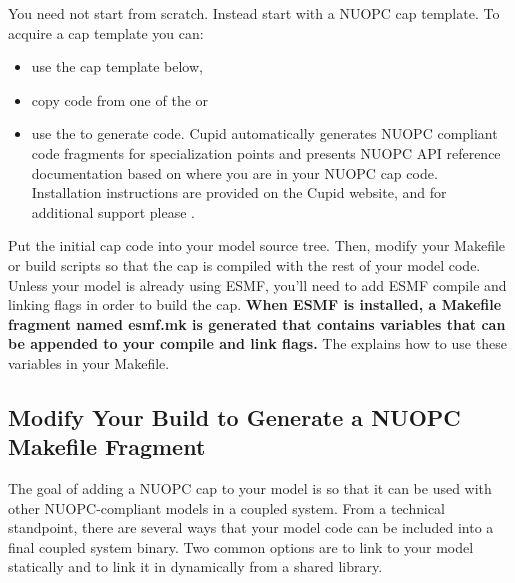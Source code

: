 You need not start from scratch.  Instead start with a NUOPC cap template.
To acquire a cap template you can:
\begin{itemize}
\item use the cap template below,

\item copy code from one of the  or

\item use the 
to generate code.  Cupid automatically generates NUOPC compliant
code fragments for specialization points and presents NUOPC API reference
documentation based on where you are in your NUOPC cap code.
Installation instructions are provided on the Cupid website, and for additional support please
.

\end{itemize}

Put the initial cap code into your model source tree.  Then, modify
your Makefile or build scripts so that the cap is compiled with the
rest of your model code.  Unless your model is already using ESMF,
you'll need to add ESMF compile and linking flags in order to build
the cap.  \textbf{When ESMF is installed, a Makefile fragment named esmf.mk
is generated that contains variables that can be appended to your compile and
link flags.}  The 
explains how to use these variables in your Makefile.


\subsection{Modify Your Build to Generate a NUOPC Makefile Fragment}
\label{sec:genmakefrag}
The goal of adding a NUOPC cap to your model is so that it can be used
with other NUOPC-compliant models in a coupled system.  From a technical
standpoint, there are several ways that your model code can be included into
a final coupled system binary.  Two common options are to link to your model
statically and to link it in dynamically from a shared library.

